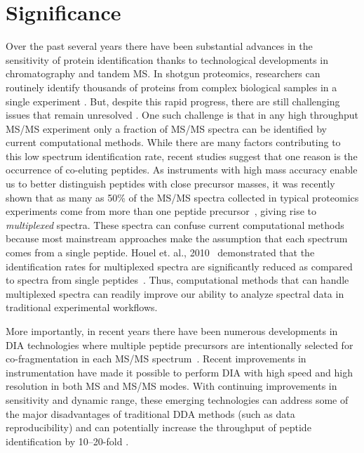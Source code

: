 \documentclass[arial,11pt]{article}
\begin{document}
\section{Significance}

Over the past several years there have been substantial advances in the sensitivity of protein identification thanks to technological developments in chromatography and tandem MS.  In shotgun proteomics, researchers can routinely identify thousands of proteins from complex biological samples in a single experiment \cite{washburn2001,brunner2007high,aebersold2003mass}. But, despite this rapid progress, there are still challenging issues that remain unresolved \cite{chalkley05comprehensive,wenner2004factors}.  One such challenge is that in any high throughput MS/MS experiment only a fraction of MS/MS spectra can be identified by current computational methods.  While there are many factors contributing to this low spectrum identification rate, recent studies suggest that one reason is the occurrence of co-eluting peptides.  As instruments with high mass accuracy enable us to better distinguish peptides with close precursor masses, it was recently shown that as many as 50\% of the MS/MS spectra collected in typical proteomics experiments come from more than one peptide precursor~\cite{gelio2008detection,pr101060v,pr800307m,houel2010quantifying}, giving rise to \emph{multiplexed} spectra.  These spectra can confuse current computational methods because most  mainstream approaches make the assumption that each spectrum comes from a single peptide. Houel et. al., 2010~\cite{houel2010quantifying} demonstrated that the identification rates for multiplexed spectra are significantly reduced as compared to  spectra from single peptides~\cite{houel2010quantifying}.  Thus, computational methods that can handle multiplexed spectra can readily improve our ability to analyze spectral data in traditional experimental workflows.

More importantly, in recent years there have been numerous developments in DIA technologies where multiple peptide precursors are intentionally selected for co-fragmentation in each MS/MS spectrum~\cite{venable2004aaq, masselon2003itp, chakraborty2007uim, michalski2011mass,Gillet12targeted}.  Recent improvements in instrumentation have made it possible to perform DIA with high speed and high resolution in both MS and MS/MS modes. With continuing improvements in sensitivity and dynamic range, these emerging technologies can address some of the major disadvantages of traditional DDA methods (such as data reproducibility) and can potentially increase the throughput of peptide identification by 10--20-fold \cite{michalski2011mass,blackburn2010}.
\end{document}
